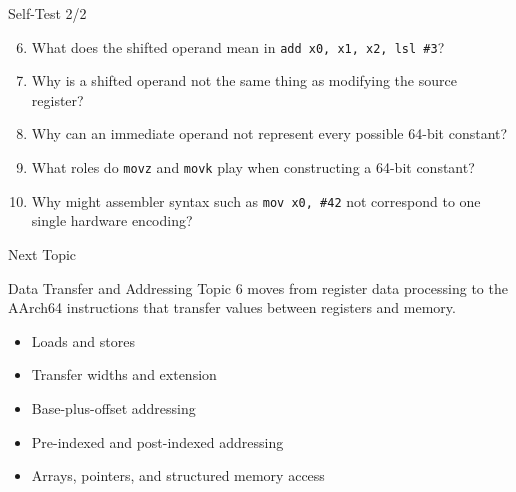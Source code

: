 \documentclass[aspectratio=169,11pt,t]{beamer}
\newcommand{\code}[1]{\texttt{#1}}
\begin{document}


\begin{frame}{Self-Test 2/2}
\begin{enumerate}
\setcounter{enumi}{5}
\item What does the shifted operand mean in \code{add x0, x1, x2, lsl \#3}?
\item Why is a shifted operand not the same thing as modifying the source register?
\item Why can an immediate operand not represent every possible 64-bit constant?
\item What roles do \code{movz} and \code{movk} play when constructing a 64-bit constant?
\item Why might assembler syntax such as \code{mov x0, \#42} not correspond to one single hardware encoding?
\end{enumerate}
\end{frame}




\begin{frame}{Next Topic}
\begin{block}{Data Transfer and Addressing}
Topic 6 moves from register data processing to the AArch64 instructions that transfer values between registers and memory.
\end{block}
\vspace{0.25cm}
\begin{itemize}
\item Loads and stores
\item Transfer widths and extension
\item Base-plus-offset addressing
\item Pre-indexed and post-indexed addressing
\item Arrays, pointers, and structured memory access
\end{itemize}
\end{frame}
\end{document}
